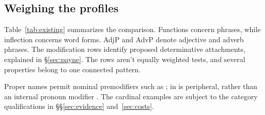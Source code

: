 \documentclass[12pt]{article}
\begin{document}
\subsection{Weighing the profiles}\label{sec:membership}

Table~\ref{tab:existing} summarizes the comparison. Functions concern phrases, while inflection concerns word forms. AdjP and AdvP denote adjective and adverb phrases. The modification rows identify proposed determinative attachments, explained in §\ref{sec:payne}. The rows aren't equally weighted tests, and several properties belong to one connected pattern.

Proper names permit nominal premodifiers such as ;  in  is peripheral, rather than an internal pronoun modifier \citep[429--430, 519--520]{huddleston2002}. The cardinal examples are subject to the category qualifications in §§\ref{sec:evidence} and~\ref{sec:costs}.
\end{document}
